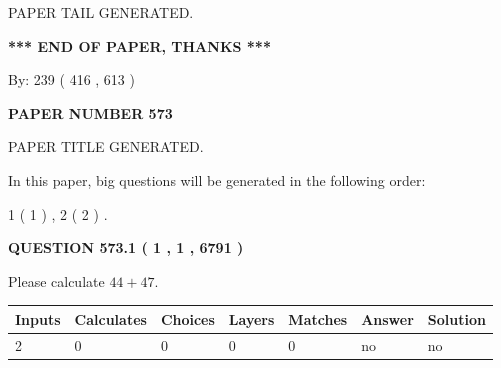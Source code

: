 \documentclass[12pt]{article}
\begin{document}
   
   
\vspace{2.0in} PAPER TAIL GENERATED.
   
   
   
   
\vspace{1.0in} 
{\textbf{\large{ *** END OF PAPER, THANKS *** }}} 
   
   
\hspace{1.0in} By: 
 239 ( 416 ,  613 )
   
   
   
   
\newpage 
\setcounter{page}{ 
   573001 } 
   
   
   
   
 {\textbf{ \Large{ PAPER NUMBER  573  }}}
   
   
\vspace{0.2in}
   
   
   
   
   
   
   
   
 \vspace{0.2in}
 
 
 
 
   
   
 PAPER TITLE GENERATED.
   
   
   
\vspace{0.2in}
   
In this paper, big questions will be generated in the following order: 
   
   
   1 ( 1 )
 ,
   2 ( 2 )
 .
  
\vspace{0.2in}
  
{\textbf{\Large{QUESTION
573.1 
 ( 1 , 1 , 6791 )
}}}
  
  
 
Please calculate $ %
44 +  %
47 $.
 
 
   
   
   
   
\noindent\begin{tabular}{|l|l|l|l|l|l|l|}
 \hline
Inputs & Calculates & Choices & Layers & Matches & Answer & Solution \\ \hline
 2  & 
 0  & 
 0
  & 
 0  & 
 0  & 
  no & 
  no 
  \\ \hline
 \end{tabular}
   
\end{document}
